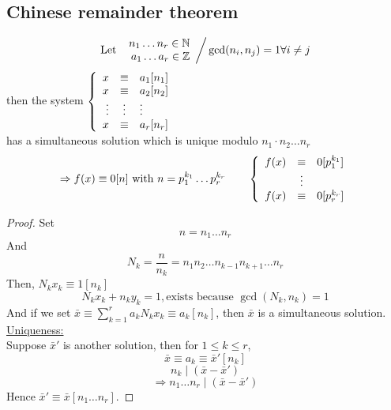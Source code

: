 \documentclass{report}
\begin{document}
\subsection*{Chinese remainder theorem}
\[ 
\text{Let  }
\left.
\begin{array}{r c l}
n_1 \dots n_r \in \mathbb{N}\\
a_1 \dots a_r \in \mathbb{Z}\\
\end{array}
\right/ \gcd(n_i,n_j)=1 \forall i \neq j
\]
then the  system
$
\left \{
\begin{array}{r c l}
x &\equiv& a_1[n_1]\\
x &\equiv& a_2[n_2]\\
\vdots &\vdots& \vdots\\
x &\equiv& a_r[n_r]\\
\end{array}
\right.
$ \\
has a simultaneous solution which is unique modulo $n_1 \cdot n_2 \dots n_r$
\[
\Rightarrow f(x) \equiv 0[n] \text{ with  } n = p_1^{k_1} \dots p_r^{k_r} \qquad 
\left \{
\begin{array}{r c l}
f(x) &\equiv& 0[p_1^{k_1}]\\
&\vdots&\\
f(x) &\equiv& 0[p_r^{k_r}]\\
\end{array}
\right.
\]
\newpage
\begin{proof}
Set 
\[
n=n_1 \dots n_r
\]
And
\[
N_k=\frac{n}{n_k}=n_1 n_2 \dots n_{k-1} n_{k+1} \dots n_r
\]
Then, $N_k x_k \equiv 1 [n_k]$\\
\[
N_k x_k + n_k y_k = 1, \text{exists because } \gcd(N_k, n_k)=1
\]
And if we set $\bar{x} \equiv \sum_{k=1}^{r}a_k N_k x_k \equiv a_k [n_k]$, then $\bar{x}$ is a simultaneous solution.\\



\underline{Uniqueness:} \\
Suppose $\bar{x}'$ is another solution, then for $1 \leq k \leq r$,
\[
\bar{x} \equiv a_k \equiv \bar{x}' [n_k]
\]
\[
n_k \mid (\bar{x} - \bar{x}')
\]
\[
\Rightarrow n_1 \dots n_r \mid (\bar{x}-\bar{x}')
\]
Hence $\bar{x}' \equiv \bar{x} [n_1 \dots n_r]$.
\end{proof}
\end{document}
